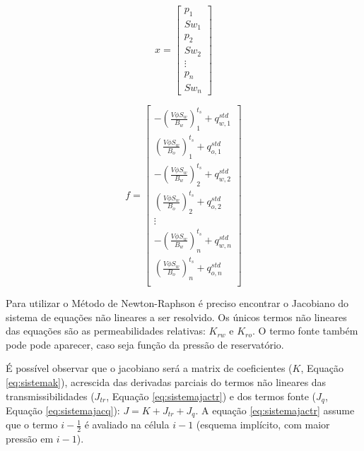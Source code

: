 \documentclass[final,5p]{elsarticle}
\numberwithin{equation}{section}
\begin{document}
        \begin{equation}
            x =
            \begin{bmatrix}
                p_{1}  \\
                Sw_{1}  \\
                p_{2}  \\
                Sw_{2}  \\
                \vdots \\
                p_{n} \\
                Sw_{n}
            \end{bmatrix}
            \label{eq:sistemax}
        \end{equation}

        \begin{equation}
            f =
            \begin{bmatrix}
                - \left(\frac{V \phi S_w}{B_w}\right)_1^{t_s} + q^{std}_{w,1}  \\
                  \left(\frac{V \phi S_w}{B_o}\right)_1^{t_s} + q^{std}_{o,1}  \\
                - \left(\frac{V \phi S_w}{B_w}\right)_2^{t_s} + q^{std}_{w,2}  \\
                  \left(\frac{V \phi S_w}{B_o}\right)_2^{t_s} + q^{std}_{o,2}  \\
                \vdots \\
                - \left(\frac{V \phi S_w}{B_w}\right)_n^{t_s} + q^{std}_{w,n}  \\
                  \left(\frac{V \phi S_w}{B_o}\right)_n^{t_s} + q^{std}_{o,n}  \\
            \end{bmatrix}
            \label{eq:sistemaf}
        \end{equation}

        Para utilizar o Método de Newton-Raphson é preciso encontrar o Jacobiano do sistema de equações não lineares a ser resolvido. Os únicos termos não lineares das equações são as permeabilidades relativas: $K_{rw}$ e $K_{ro}$. O termo fonte também pode pode aparecer, caso seja função da pressão de reservatório.

        É possível observar que o jacobiano será a matrix de coeficientes ($K$, Equação \ref{eq:sistemak}), acrescida das derivadas parciais do termos não lineares das transmissibilidades ($J_{tr}$, Equação \ref{eq:sistemajactr}) e dos termos fonte ($J_{q}$, Equação \ref{eq:sistemajacq}): $J=K+J_{tr}+J_q$. A equação \ref{eq:sistemajactr} assume que o termo $i-\frac{1}{2}$ é avaliado na célula $i-1$ (esquema implícito, com maior pressão em $i-1$).
\end{document}
